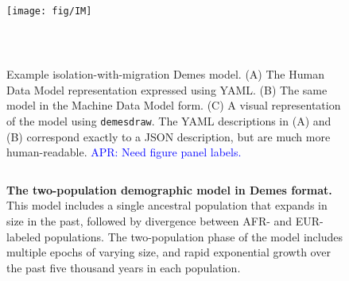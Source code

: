 \documentclass[11pt]{article}
\newcommand{\aprcomment}[1]{{\textcolor{blue}{APR: #1}}}
\begin{document}
\begin{figure}[h!]
    \begin{minipage}{0.44\textwidth}
        \begin{tcolorbox}
            \inputminted[fontsize=\scriptsize,linenos,numbersep=5pt]{yaml}{models/IM.yaml}
        \end{tcolorbox}
        \begin{tcolorbox}
            \texttt{[image: fig/IM]}
        \end{tcolorbox}
    \end{minipage}\hfill
    \begin{minipage}{0.54\textwidth}
        \begin{tcolorbox}
            \inputminted[fontsize=\scriptsize,linenos,numbersep=5pt]{yaml}{models/IM-resolved.yaml}
        \end{tcolorbox}
    \end{minipage}\\
    \caption{
        \label{fig:IM}
        Example isolation-with-migration Demes model. (A) The Human Data Model
        representation expressed using YAML. (B) The same model in the
        Machine Data Model form.
        (C) A visual representation of the model using \texttt{demesdraw}.
        The YAML descriptions in (A) and (B) correspond exactly to a JSON description,
        but are much more human-readable.
        \aprcomment{Need figure panel labels.}
    }
\end{figure}

\begin{figure}[h!]
    \begin{tcolorbox}
        \inputminted[fontsize=\scriptsize,linenos,numbersep=5pt]{yaml}{models/tennessen.yaml}
    \end{tcolorbox}
    \caption{
        \textbf{The \citet{tennessen2012evolution} two-population
        demographic model in Demes format.}
        This model includes a single ancestral population that expands in
        size in the past, followed by divergence between AFR- and EUR-labeled
        populations. The two-population phase of the model includes multiple
        epochs of varying size, and rapid exponential growth over the past
        five thousand years in each population.
    }
    \label{fig:tennessen}
\end{figure}
\end{document}
